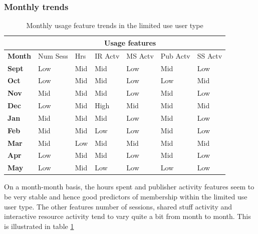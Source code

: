 \documentclass{acm_proc_article-sp}
\begin{document}
\subsubsection{Monthly trends}
\begin{table}
\label{cluster0month}
\caption{Monthly usage feature trends in the limited use user type}
\begin{tabular}{|p{1.2cm}|p{0.7cm}|p{0.7cm}|p{0.7cm}|p{0.7cm}|p{0.8cm}|p{0.8cm}|}
\hline
& \multicolumn{6}{c|}{\textbf{Usage features}}  \\ \hline
 \textbf{Month} 
 & Num Sess & Hrs & IR Actv & MS Actv & Pub Actv & SS Actv \\ \hline
\textbf{Sept} & Low                                    & Mid   & Mid         & Low             & Mid            & Low                 \\  \hline
\textbf{Oct}   & Low                                    & Mid   & Mid         & Low             & Low            & Mid                 \\  \hline
\textbf{Nov}  & Mid                                    & Mid   & Mid         & Low             & Mid            & Low                 \\  \hline
\textbf{Dec}  & Low                                    & Mid   & High        & Mid             & Mid            & Mid                 \\  \hline
\textbf{Jan}   & Mid                                    & Mid   & Mid         & Low             & Mid            & Low                 \\ \hline
\textbf{Feb}  & Mid                                    & Mid   & Low         & Low             & Mid            & Low                 \\  \hline
\textbf{Mar}     & Mid                                    & Low   & Mid         & Mid             & Mid            & Mid                 \\ \hline
\textbf{Apr}     & Low                                    & Mid   & Mid         & Low             & Mid            & Low                 \\ \hline
\textbf{May}       & Low                                    & Mid   & Low         & Low             & Low            &   Low              \\ \hline   
\end{tabular}
\end{table}
On a month-month basis, the hours spent and publisher activity features seem to be very stable and hence good predictors of membership within the limited use user type. The other features number of sessions, shared stuff activity and  interactive resource activity tend to vary quite a bit from month to month. This is illustrated in table \ref{cluster0month}
\end{document}
